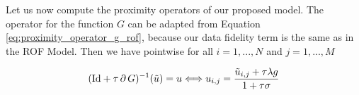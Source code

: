         Let us now compute the proximity operators of our proposed model. The operator for the function $G$ can be adapted from Equation \ref{eq:proximity_operator_g_rof}, because our data fidelity term is the same as in the ROF Model. Then we have pointwise for all $i = 1, ..., N$ and $j = 1, ..., M$

            \begin{equation}
                (\textnormal{Id} + \tau\,\partial\,G)^{-1}(\tilde{u}) = u \Longleftrightarrow u_{i,j} = \frac{\tilde{u}_{i,j} + \tau\lambda g}{1 + \tau\sigma}
            \label{eq:proximity_operator_g_mumford_shah}
            \end{equation}





        

